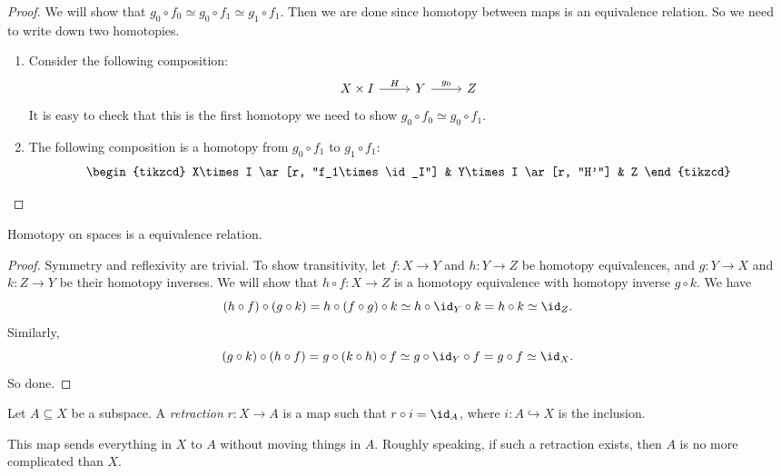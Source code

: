 \documentclass[a4paper]{article}
\begin{document}
\begin{proof}
  We will show that $g_0 \circ f_0 \simeq g_0 \circ f_1 \simeq g_1 \circ f_1$. Then we are done since homotopy between maps is an equivalence relation. So we need to write down two homotopies.

  \begin{enumerate}
    \item Consider the following composition:
      \[
        \begin{tikzcd}
          X\times I \ar[r, "H"] & Y \ar[r, "g_0"] & Z
        \end{tikzcd}
      \]
      It is easy to check that this is the first homotopy we need to show $g_0\circ f_0 \simeq g_0 \circ f_1$.
    \item The following composition is a homotopy from $g_0 \circ f_1$ to $g_1 \circ f_1$:
      \[
        \begin{tikzcd}
          X\times I \ar[r, "f_1\times \id_I"] & Y\times I \ar[r, "H'"] & Z
        \end{tikzcd}
      \]
  \end{enumerate}
\end{proof}

\begin{prop}
  Homotopy on spaces is a equivalence relation.
\end{prop}

\begin{proof}
  Symmetry and reflexivity are trivial. To show transitivity, let $f: X \to Y$ and $h: Y \to Z$ be homotopy equivalences, and $g: Y \to X$ and $k: Z \to Y$ be their homotopy inverses. We will show that $h \circ f: X \to Z$ is a homotopy equivalence with homotopy inverse $g \circ k$. We have
  \[
    (h \circ f) \circ (g \circ k) = h \circ (f \circ g) \circ k \simeq h \circ \id_Y \circ k = h \circ k \simeq \id_Z.
  \]
  Similarly,
  \[
    (g \circ k) \circ (h \circ f) = g \circ (k \circ h) \circ f \simeq g \circ \id_Y \circ f = g \circ f \simeq \id_X.
  \]
  So done.
\end{proof}

\begin{defi}[Retraction]
  Let $A\subseteq X$ be a subspace. A \emph{retraction} $r: X\to A$ is a map such that $r\circ i = \id_A$, where $i: A\hookrightarrow X$ is the inclusion.
\end{defi}
This map sends everything in $X$ to $A$ without moving things in $A$. Roughly speaking, if such a retraction exists, then $A$ is no more complicated than $X$.
\end{document}
